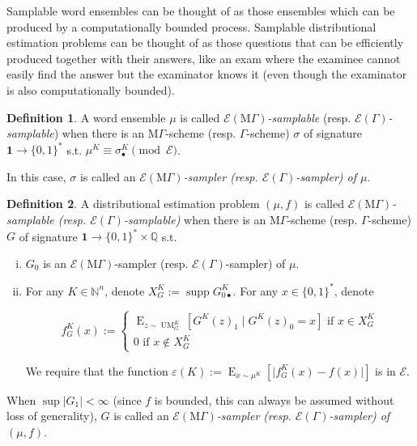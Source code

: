 \documentclass{article}
\numberwithin{equation}{section}
\theoremstyle{definition}
\newtheorem{definition}{Definition}[section]
\theoremstyle{plain}
\newcommand{\Bool}{\{0,1\}}
\newcommand{\Words}{{\Bool^*}}
\DeclareMathOperator{\Supp}{supp}
\DeclareMathOperator{\E}{E}
\DeclareMathOperator{\UM}{UM}
\newcommand{\Nats}{\mathbb{N}}
\newcommand{\Rats}{\mathbb{Q}}
\newcommand{\Abs}[1]{\lvert #1 \rvert}
\newcommand{\MGrow}{\mathrm{M}\Gamma}
\newcommand{\Fall}{\mathcal{E}}
\newcommand{\EG}{\Fall(\Gamma)}
\newcommand{\EMG}{\Fall(\MGrow)}
\begin{document}
Samplable word ensembles can be thought of as those ensembles which can be produced by a computationally bounded process. Samplable distributional estimation problems can be thought of as those questions that can be efficiently produced together with their answers, like an exam where the examinee cannot easily find the answer but the examinator knows it (even though the examinator is also computationally bounded).

\begin{samepage}
\begin{definition}

A word ensemble $\mu$ is called \emph{$\EMG$-samplable} (resp. \emph{$\EG$-samplable}) when there is an $\MGrow$-scheme (resp. $\Gamma$-scheme) $\sigma$ of signature ${\bm{1} \rightarrow \Words}$  s.t. $\mu^{K} \equiv \sigma_\bullet^K \pmod \Fall$.

In this case, $\sigma$ is called an \emph{$\EMG$-sampler (resp. $\EG$-sampler) of $\mu$}.

\end{definition}
\end{samepage}

\begin{samepage}
\begin{definition}

A distributional estimation problem $(\mu,f)$ is called \emph{$\EMG$-samplable (resp. $\EG$-samplable)} when there is an $\MGrow$-scheme (resp. $\Gamma$-scheme) $G$ of signature $\bm{1} \rightarrow \Words \times \Rats$ s.t. 

\begin{enumerate}[(i)]

\item $G_0$ is an $\EMG$-sampler (resp. $\EG$-sampler) of $\mu$.

\item For any $K \in \Nats^n$, denote $X_{G}^K:=\Supp G_{0\bullet}^K$. For any $x \in \Words$, denote 

$$f_G^K(x):=\begin{cases}\E_{z \sim\UM_G^K}[G^K(z)_1 \mid G^K(z)_0 = x] \text{ if } x \in X_{G}^K \\ 0 \text{ if } x \not\in X_{G}^K \end{cases}$$

We require that the function $\varepsilon(K):=\E_{x \sim \mu^{K}}[\Abs{f_G^K(x)-f(x)}]$ is in $\Fall$.

\end{enumerate}

When $\sup{\Abs{G_1}} < \infty$ (since $f$ is bounded, this can always be assumed without loss of generality), $G$ is called an \emph{$\EMG$-sampler (resp. $\EG$-sampler) of $(\mu,f)$}.

\end{definition}
\end{samepage}
\end{document}
